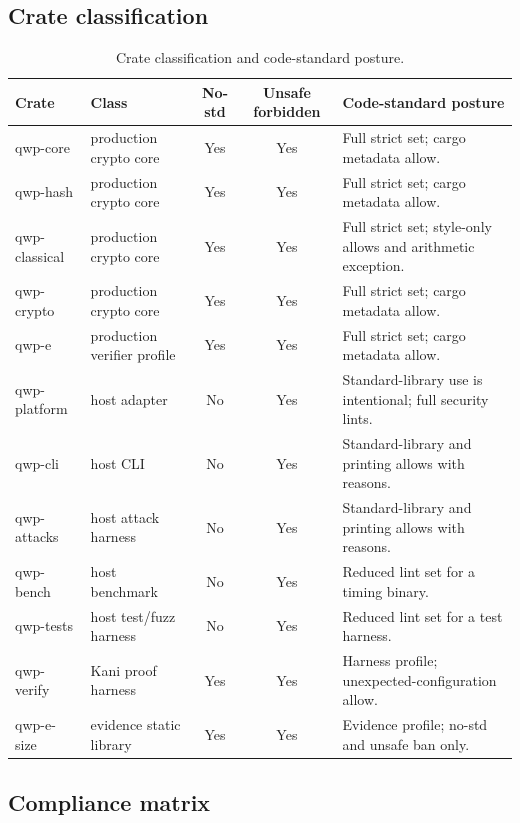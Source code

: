 \documentclass[11pt,a4paper]{article}
\begin{document}
\clearpage
\subsection{Crate classification}

\begin{table}[ht]
\centering
\caption{Crate classification and code-standard posture.}
\label{tab:crates}
\small
\begin{tabularx}{\textwidth}{@{}l l c c Y@{}}
\toprule
Crate & Class & No-std & Unsafe forbidden & Code-standard posture\\
\midrule
qwp-core & production crypto core & Yes & Yes & Full strict set; cargo metadata allow.\\
qwp-hash & production crypto core & Yes & Yes & Full strict set; cargo metadata allow.\\
qwp-classical & production crypto core & Yes & Yes & Full strict set; style-only allows and arithmetic exception.\\
qwp-crypto & production crypto core & Yes & Yes & Full strict set; cargo metadata allow.\\
qwp-e & production verifier profile & Yes & Yes & Full strict set; cargo metadata allow.\\
qwp-platform & host adapter & No & Yes & Standard-library use is intentional; full security lints.\\
qwp-cli & host CLI & No & Yes & Standard-library and printing allows with reasons.\\
qwp-attacks & host attack harness & No & Yes & Standard-library and printing allows with reasons.\\
qwp-bench & host benchmark & No & Yes & Reduced lint set for a timing binary.\\
qwp-tests & host test/fuzz harness & No & Yes & Reduced lint set for a test harness.\\
qwp-verify & Kani proof harness & Yes & Yes & Harness profile; unexpected-configuration allow.\\
qwp-e-size & evidence static library & Yes & Yes & Evidence profile; no-std and unsafe ban only.\\
\bottomrule
\end{tabularx}
\end{table}
\FloatBarrier

\subsection{Compliance matrix}
\end{document}
